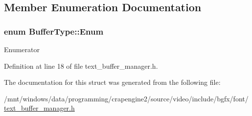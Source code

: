 \subsection{Member Enumeration Documentation}
\hypertarget{struct_buffer_type_af6eec2447862f2bd9c1f36408176ddda}{
\subsubsection[{Enum}]{\setlength{\rightskip}{0pt plus 5cm}enum {\bf Buffer\+Type\+::\+Enum}}}\label{struct_buffer_type_af6eec2447862f2bd9c1f36408176ddda}
\begin{Desc}
\item[Enumerator]\par
\begin{description}
\item[{\em 
\hypertarget{struct_buffer_type_af6eec2447862f2bd9c1f36408176dddaaff0ca8d763df9fb0a2da604f3b017b5d}{Static}\label{struct_buffer_type_af6eec2447862f2bd9c1f36408176dddaaff0ca8d763df9fb0a2da604f3b017b5d}
}]\item[{\em 
\hypertarget{struct_buffer_type_af6eec2447862f2bd9c1f36408176dddaad50474e8a51b3de3400081a38a970528}{Dynamic}\label{struct_buffer_type_af6eec2447862f2bd9c1f36408176dddaad50474e8a51b3de3400081a38a970528}
}]\item[{\em 
\hypertarget{struct_buffer_type_af6eec2447862f2bd9c1f36408176dddaab874d27e854827e1a311b9cc412f9037}{Transient}\label{struct_buffer_type_af6eec2447862f2bd9c1f36408176dddaab874d27e854827e1a311b9cc412f9037}
}]\end{description}
\end{Desc}


Definition at line 18 of file text\+\_\+buffer\+\_\+manager.\+h.



The documentation for this struct was generated from the following file\+:\begin{DoxyCompactItemize}
\item 
/mnt/windows/data/programming/crapengine2/source/video/include/bgfx/font/\hyperlink{text__buffer__manager_8h}{text\+\_\+buffer\+\_\+manager.\+h}\end{DoxyCompactItemize}
